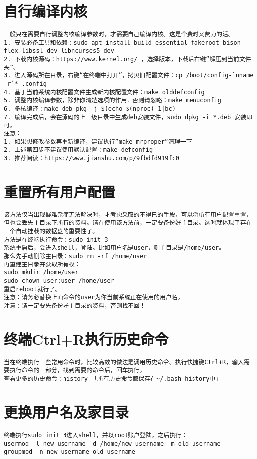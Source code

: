 \documentclass[a4paper,fontset=fandol,zihao=-4,linespread=1.2,oneside]{ctexbook}
\begin{document}
\section{自行编译内核}
\begin{lstlisting}
一般只在需要自行调整内核编译参数时，才需要自己编译内核。这是个费时又费力的活。
1. 安装必备工具和依赖：sudo apt install build-essential fakeroot bison flex libssl-dev libncurses5-dev
2. 下载内核源码：https://www.kernel.org/ ，选择版本，下载后右键“解压到当前文件夹”。
3. 进入源码所在目录，右键“在终端中打开”，拷贝旧配置文件：cp /boot/config-`uname -r`* .config
4. 基于当前系统内核配置文件生成新内核配置文件：make olddefconfig
5. 调整内核编译参数，除非你清楚选项的作用，否则请忽略：make menuconfig
6. 多核编译：make deb-pkg -j $(echo $(nproc)-1|bc)
7. 编译完成后，会在源码的上一级目录中生成deb安装文件，sudo dpkg -i *.deb 安装即可。
注意：
1. 如果想修改参数再重新编译，建议执行”make mrproper“清理一下
2. 上述第四步不建议使用默认配置：make defconfig
3. 推荐阅读：https://www.jianshu.com/p/9fbdfd919fc0
\end{lstlisting}

\section{重置所有用户配置}
\begin{lstlisting}
该方法仅当出现疑难杂症无法解决时，才考虑采取的不得已的手段，可以将所有用户配置重置，但也会丢失主目录下所有的资料。请在使用该方法前，一定要备份好主目录。这时就体现了存在一个自动挂载的数据盘的重要性了。
方法是在终端执行命令：sudo init 3
系统重启后，会进入shell，登陆。比如用户名是user，则主目录是/home/user。
那么先手动删除主目录：sudo rm -rf /home/user
再重建主目录并获取所有权：
sudo mkdir /home/user
sudo chown user:user /home/user
重启reboot就行了。
注意：请务必替换上面命令的user为你当前系统正在使用的用户名。
注意：请一定要先备份好主目录的资料，否则找不回！
\end{lstlisting}

\section{终端Ctrl+R执行历史命令}
\begin{lstlisting}
当在终端执行一些常用命令时，比较高效的做法是调用历史命令。执行快捷键Ctrl+R，输入需要执行命令的一部分，找到需要的命令后，回车执行。
查看更多的历史命令：history 「所有历史命令都保存在~/.bash_history中」
\end{lstlisting}

\section{更换用户名及家目录}
\begin{lstlisting}
终端执行sudo init 3进入shell，并以root账户登陆，之后执行：
usermod -l new_username -d /home/new_username -m old_username
groupmod -n new_username old_username
\end{lstlisting}
\end{document}
